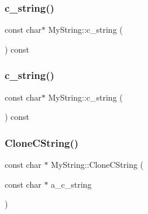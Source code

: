 \mbox{\label{class_my_string_aff2af0cf30db39fe24a235670ee6ff25}} 
\subsubsection{\texorpdfstring{c\_string()}{c\_string()}\hspace{0.1cm}{\footnotesize\ttfamily [2/3]}}
{\footnotesize\ttfamily const char$\ast$ My\+String\+::c\+\_\+string (\begin{DoxyParamCaption}{ }\end{DoxyParamCaption}) const\hspace{0.3cm}{\ttfamily [inline]}}

\mbox{\label{class_my_string_aff2af0cf30db39fe24a235670ee6ff25}} 
\subsubsection{\texorpdfstring{c\_string()}{c\_string()}\hspace{0.1cm}{\footnotesize\ttfamily [3/3]}}
{\footnotesize\ttfamily const char$\ast$ My\+String\+::c\+\_\+string (\begin{DoxyParamCaption}{ }\end{DoxyParamCaption}) const\hspace{0.3cm}{\ttfamily [inline]}}

\mbox{\label{class_my_string_a40753dcfa3314a8993f32bdd75d67ce2}} 
\subsubsection{\texorpdfstring{CloneCString()}{CloneCString()}\hspace{0.1cm}{\footnotesize\ttfamily [1/3]}}
{\footnotesize\ttfamily const char $\ast$ My\+String\+::\+Clone\+C\+String (\begin{DoxyParamCaption}\item[{const char $\ast$}]{a\+\_\+c\+\_\+string }\end{DoxyParamCaption})\hspace{0.3cm}{\ttfamily [static]}}

